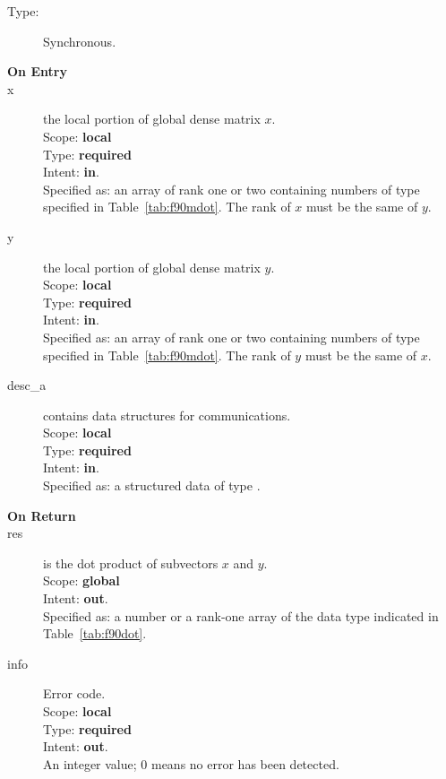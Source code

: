 \begin{description}
\item[Type:] Synchronous.
\item[\bf On Entry]
\item[x] the local portion of global dense matrix
$x$. \\
Scope: {\bf local} \\
Type: {\bf required} \\
Intent: {\bf in}.\\
Specified as: an array of rank one or two
containing numbers of type specified in
Table~\ref{tab:f90mdot}. The rank of $x$ must be the same of $y$. 
\item[y] the local portion of global dense matrix
$y$. \\
Scope: {\bf local} \\
Type: {\bf required} \\
Intent: {\bf in}.\\
Specified as: an array of rank one or two
containing numbers of type specified in
Table~\ref{tab:f90mdot}. The rank of $y$ must be the same of $x$. 
\item[desc\_a] contains data structures for communications.\\
Scope: {\bf local} \\
Type: {\bf required}\\
Intent: {\bf in}.\\
Specified as: a structured data of type \descdata.
\item[\bf On Return] 
\item[res] is the dot product of subvectors $x$ and $y$.\\
Scope: {\bf global} \\
Intent: {\bf out}.\\
Specified as: a number or a rank-one array  of the data type indicated
in Table~\ref{tab:f90dot}. 
\item[info] Error code.\\
Scope: {\bf local} \\
Type: {\bf required} \\
Intent: {\bf out}.\\
An integer value; 0 means no error has been detected. 
\end{description}

%
%



